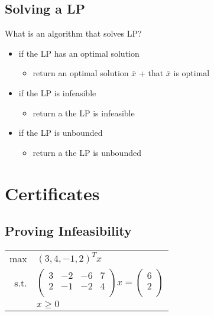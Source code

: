 \documentclass[letterpaper, 12pt]{article}
\newcommand{\red}[1]{{\color{red}{#1}}}
\begin{document}
    \subsection{Solving a LP}
    What is an algorithm that solves LP?
    \begin{itemize}
        \item if the LP has an optimal solution
        \begin{itemize}
            \item return an optimal solution $\bar{x}$ + \red{proof} that $\bar{x}$ is optimal
        \end{itemize}
        \item if the LP is infeasible
        \begin{itemize}
            \item return a \red{proof} the LP is infeasible
        \end{itemize}
        \item if the LP is unbounded
        \begin{itemize}
            \item return a \red{proof} the LP is unbounded
        \end{itemize}
    \end{itemize}
    
    \pagebreak
    \section{Certificates}
    \subsection{Proving Infeasibility}
    \begin{tabular}{rl}
        max & $(3,4,-1,2)^Tx$\\
        s.t. & $\begin{pmatrix}
            3 & -2 & -6 & 7\\
            2 & -1 & -2 & 4\\
        \end{pmatrix} x = \begin{pmatrix}
            6\\
            2\\
        \end{pmatrix}$\\
        & $x \geq 0$\\
    \end{tabular}
\end{document}
